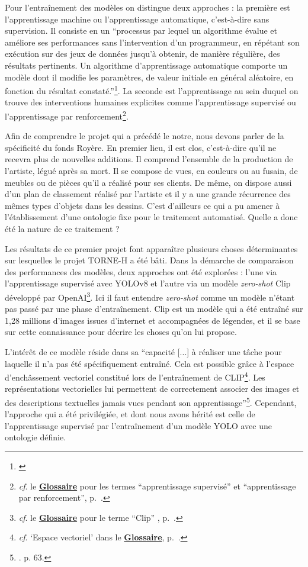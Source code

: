 \documentclass[12pt,twoside]{book}
\begin{document}
Pour l'entraînement des modèles on distingue deux approches : la première est l'apprentissage machine ou l'apprentissage automatique, c'est-à-dire sans supervision. Il consiste en un \enquote{processus par lequel un algorithme évalue et améliore ses performances sans l’intervention d’un programmeur, en répétant son exécution sur des jeux de données jusqu’à obtenir, de manière régulière, des résultats pertinents. Un algorithme d’apprentissage automatique comporte un modèle dont il modifie les paramètres, de valeur initiale en général aléatoire, en fonction du résultat constaté.}\footnote{\cite{carius_lexique_2024}}. La seconde est l'apprentissage au sein duquel on trouve des interventions humaines explicites comme l'apprentissage supervisé ou l'apprentissage par renforcement\footnote{\textit{cf}. le \textbf{\hyperref[sec:Glossaire]{Glossaire}} pour les termes \enquote{apprentissage supervisé} et \enquote{apprentissage par renforcement}, p.~\pageref{sec:Glossaire}.}.

Afin de comprendre le projet qui a précédé le notre, nous devons parler de la spécificité du fonds Royère. En premier lieu, il est clos, c'est-à-dire qu'il ne recevra plus de nouvelles additions. Il comprend l'ensemble de la production de l'artiste, légué après sa mort. Il se compose de vues, en couleurs ou au fusain, de meubles ou de pièces qu'il a réalisé pour ses clients. De même, on dispose aussi d'un plan de classement réalisé par l'artiste et il y a une grande récurrence des mêmes types d'objets dans les dessins. C'est d'ailleurs ce qui a pu amener à l'établissement d'une ontologie fixe pour le traitement automatisé. Quelle a donc été la nature de ce traitement ?

Les résultats de ce premier projet font apparaître plusieurs choses déterminantes sur lesquelles le projet TORNE-H a été bâti. Dans la démarche de comparaison des performances des modèles, deux approches ont été explorées : l'une via l'apprentissage supervisé avec \mbox{YOLOv8} et l'autre via un modèle \textit{zero-shot} Clip développé par OpenAI\footnote{\textit{cf}. le \textbf{\hyperref[sec:Glossaire]{Glossaire}} pour le terme \enquote{Clip} , p.~\pageref{sec:Glossaire}.}. Ici il faut entendre \textit{zero-shot} comme un modèle n'étant pas passé par une phase d'entraînement. Clip est un modèle qui a été entraîné sur 1,28 millions d'images issues d'internet et accompagnées de légendes, et il se base sur cette connaissance pour décrire les choses qu'on lui propose. \hfill \break

L'intérêt de ce modèle réside dans sa \enquote{capacité [...] à réaliser une
tâche pour laquelle il n’a pas été spécifiquement entraîné. Cela est possible grâce à l’espace
d’enchâssement vectoriel constitué lors de l’entraînement de CLIP\footnote{\textit{cf}. \enquote{Espace vectoriel} dans le \textbf{\hyperref[sec:Glossaire]{Glossaire}}, p.~\pageref{sec:Glossaire}.}. Les représentations vectorielles
lui permettent de correctement associer des images et des descriptions textuelles jamais
vues pendant son apprentissage}\footnote{\cite{grim_vision_2024}. p. 63.}. Cependant, l'approche qui a été privilégiée, et dont nous avons hérité est celle de l'apprentissage supervisé par l'entraînement d'un modèle YOLO avec une ontologie définie.
\end{document}
